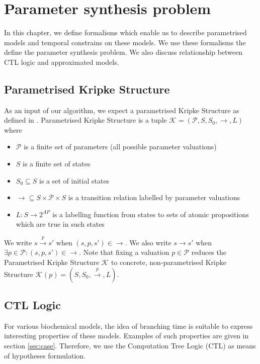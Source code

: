 \documentclass[12pt,oneside]{fithesis2}
\newcommand{\ks}[1][]{\ensuremath{\mathcal{K}_{#1}}}
\newcommand{\fullKs}{\ensuremath{ \ks = (\params, S, S_0, \trans{}, L) }}
\newcommand{\trans}[1]{\stackrel{#1}{\rightarrow}}
\newcommand{\params}{\mathcal{P}}
\begin{document}
	\chapter{Parameter synthesis problem}
	
		In this chapter, we define formalisms which enable us to describe parametrised models and temporal constrains on these models. We use these formalisms the define the parameter synthesis problem. We also discuss relationship between CTL logic and approximated models.
		
		\section{Parametrised Kripke Structure}
	
			As an input of our algorithm, we expect a parametrised Kripke Structure as defined in \cite{ieee}. Parametrised Kripke Structure is a tuple $\fullKs$ where
			
			\begin{itemize}
				\item $\params$ is a finite set of parameters (all possible parameter valuations)
				\item $S$ is a finite set of states
				\item $S_0 \subseteq S$ is a set of initial states
				\item $\trans{} \subseteq S \times \params \times S$ is a transition relation labelled by parameter valuations 
				\item $L: S \rightarrow 2^{AP} $ is a labelling function from states to sets of atomic propositions which are true in such states
			\end{itemize} 		
			
			We write $ s \trans{p} s' $ when $ (s, p, s') \in \trans{} $. We also write $ s \trans{} s'$ when $\exists p \in \params : (s, p, s') \in \trans{} $. Note that fixing a valuation $p \in \params$ reduces the Parametrised Kripke Structure $\ks$ to concrete, non-parametrised Kripke Structure $\ks(p) = (S, S_0, \trans{p}, L)$.
						
		\section{CTL Logic}
		
			\label{sec:ctl}
			For various biochemical models, the idea of branching time is suitable to express interesting properties of these models. Examples of such properties are given in section \ref{sec:case}. Therefore, we use the Computation Tree Logic (CTL) \cite{clarke} as means of hypotheses formulation. 
\end{document}
